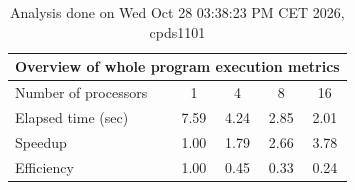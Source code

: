 \begin{table}[h]
\begin{center}
\begin{tabular}{|l|c|c|c|c|}
\hline
\multicolumn{5}{|c|}{Overview of whole program execution metrics} \\
\hline
\hline
Number of processors & 1 & 4 & 8 & 16 \\
\hline
Elapsed time (sec)      &       7.59 &       4.24 &       2.85 &       2.01 \\
\hline
Speedup                 &       1.00 &       1.79 &       2.66 &       3.78 \\
\hline
Efficiency              &       1.00 &       0.45 &       0.33 &       0.24 \\
\hline
\end{tabular}
\end{center}
\caption{ Analysis done on Wed Oct 28 03:38:23 PM CET 2026, cpds1101}
\end{table}
